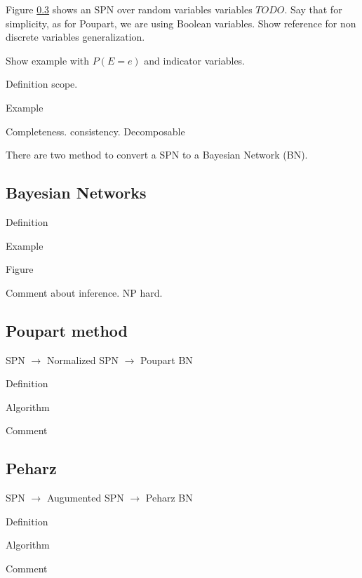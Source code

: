 %
%

Figure \ref{} shows an SPN over random variables variables $TODO$.
Say that for simplicity, as for Poupart, we are using Boolean variables. 
Show reference for non discrete variables generalization.

\begin{example}
Show example with $P(E=e)$ and indicator variables.	
\end{example}


Definition scope.

Example

Completeness. consistency. Decomposable

There are two method to convert a SPN to a Bayesian Network (BN)\cite{pear88}.


\subsection{Bayesian Networks}

Definition

Example

Figure

Comment about inference. NP hard.

\subsection{Poupart method}

SPN $\rightarrow$ Normalized SPN $\rightarrow$ Poupart BN

Definition

Algorithm

Comment

\subsection{Peharz}

SPN $\rightarrow$ Augumented SPN $\rightarrow$ Peharz BN

Definition

Algorithm

Comment